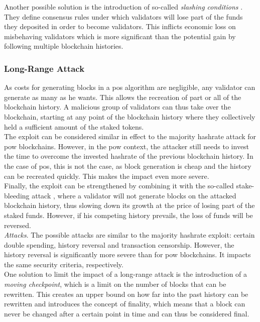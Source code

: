 \documentclass[12pt,a4paper]{article}
\begin{document}
Another possible solution is the introduction of so-called \textit{slashing conditions} \cite{casper}. They define consensus rules under which validators will lose part of the funds they deposited in order to become \glspl{validator}. This inflicts economic loss on misbehaving \glspl{validator} which is more significant than the potential gain by following multiple blockchain histories.\\

\subsubsection{Long-Range Attack}

As costs for generating \glspl{block} in a \acrshort{pos} algorithm are negligible, any \gls{validator} can generate as many as he wants. This allows the recreation of part or all of the blockchain history. A malicious group of \glspl{validator} can thus take over the \gls{blockchain}, starting at any point of the blockchain history where they collectively held a sufficient amount of the staked tokens.\\

The exploit can be considered similar in effect to the majority hashrate attack for \acrshort{pow} \glspl{blockchain}. However, in the \acrshort{pow} context, the attacker still needs to invest the time to overcome the invested \gls{hashrate} of the previous blockchain history. In the case of \acrshort{pos}, this is not the case, as block generation is cheap and the history can be recreated quickly. This makes the impact even more severe.\\

Finally, the exploit can be strengthened by combining it with the so-called stake-bleeding attack \cite{bleeding}, where a \gls{validator} will not generate \glspl{block} on the attacked blockchain history, thus slowing down its growth at the price of losing part of the staked funds. However, if his competing history prevails, the loss of funds will be reversed.\\

\textit{Attacks}. The possible attacks are similar to the majority hashrate exploit: certain double spending, history reversal and transaction censorship. However, the history reversal is significantly more severe than for \acrshort{pow} \glspl{blockchain}. It impacts the same security criteria, respectively.\\

One solution to limit the impact of a long-range attack is the introduction of a \textit{moving checkpoint}, which is a limit on the number of blocks that can be rewritten. This creates an upper bound on how far into the past history can be rewritten and introduces the concept of finality, which means that a block can never be changed after a certain point in time and can thus be considered final.\\
\end{document}
